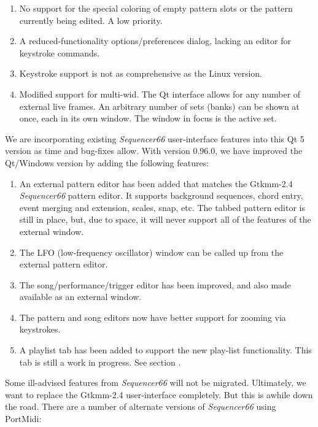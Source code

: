    \begin{enumerate}
      \item No support for the special coloring of empty pattern slots
         or the pattern currently being edited. A low priority.
      \item A reduced-functionality options/preferences dialog, lacking an
         editor for keystroke commands.
      \item Keystroke support is not as comprehensive as the Linux version.
      \item Modified support for multi-wid.  The Qt interface allows
         for any number of external live frames.
         An arbitrary number of sets (banks) can be shown at once,
         each in its own window.  The window in focus is the active set.
   \end{enumerate}

   We are incorporating existing \textsl{Sequencer66} user-interface
   features into this Qt 5 version as time and bug-fixes allow.
   With version 0.96.0, we have improved the Qt/Windows version by adding the
   following features:

   \begin{enumerate}
      \item An external pattern editor has been added that matches
         the Gtkmm-2.4 \textsl{Sequencer66} pattern editor.  It supports
         background sequences, chord entry, event merging and extension,
         scales, snap, etc.  The tabbed pattern editor is still in place, but,
         due to space, it will never support all of the features of the
         external window.
      \item The LFO (low-frequency oscillator) window can be
         called up from the external pattern editor.
      \item The song/performance/trigger editor has been improved, and also
         made available as an external window.
      \item The pattern and song editors now have better support for zooming
         via keystrokes.
      \item A playlist tab has been added to support the new play-list
         functionality.  This tab is still a work in progress.
         See section .
   \end{enumerate}

   Some ill-advised features from \textsl{Sequencer66} will not be migrated.
   Ultimately, we want to replace the Gtkmm-2.4 user-interface completely.
   But this is awhile down the road.
   There are a number of alternate versions of \textsl{Sequencer66} using
   PortMidi:

